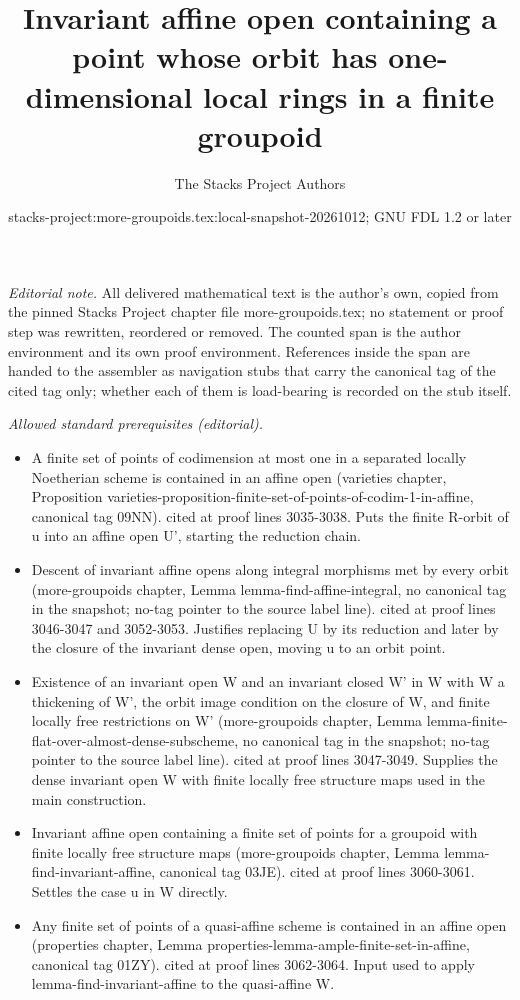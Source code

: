 \documentclass{stacks-project}
\title{Invariant affine open containing a point whose orbit has one-dimensional local rings in a finite groupoid}
\author{The Stacks Project Authors}
\date{stacks-project:more-groupoids.tex:local-snapshot-20261012; GNU FDL 1.2 or later}
\theoremstyle{plain}
\theoremstyle{definition}
\theoremstyle{remark}
\numberwithin{equation}{subsection}
\begin{document}
\maketitle
\setcounter{subsection}{1}
\noindent\textit{Editorial note.} All delivered mathematical text is the author's own, copied from the pinned Stacks Project chapter file more-groupoids.tex; no statement or proof step was rewritten, reordered or removed. The counted span is the author environment and its own proof environment. References inside the span are handed to the assembler as navigation stubs that carry the canonical tag of the cited tag only; whether each of them is load-bearing is recorded on the stub itself.\par\medskip
\noindent\textit{Allowed standard prerequisites (editorial).}\begin{itemize}
\item A finite set of points of codimension at most one in a separated locally Noetherian scheme is contained in an affine open (varieties chapter, Proposition varieties-proposition-finite-set-of-points-of-codim-1-in-affine, canonical tag 09NN). cited at proof lines 3035-3038. Puts the finite R-orbit of u into an affine open U', starting the reduction chain.
\item Descent of invariant affine opens along integral morphisms met by every orbit (more-groupoids chapter, Lemma lemma-find-affine-integral, no canonical tag in the snapshot; no-tag pointer to the source label line). cited at proof lines 3046-3047 and 3052-3053. Justifies replacing U by its reduction and later by the closure of the invariant dense open, moving u to an orbit point.
\item Existence of an invariant open W and an invariant closed W' in W with W a thickening of W', the orbit image condition on the closure of W, and finite locally free restrictions on W' (more-groupoids chapter, Lemma lemma-finite-flat-over-almost-dense-subscheme, no canonical tag in the snapshot; no-tag pointer to the source label line). cited at proof lines 3047-3049. Supplies the dense invariant open W with finite locally free structure maps used in the main construction.
\item Invariant affine open containing a finite set of points for a groupoid with finite locally free structure maps (more-groupoids chapter, Lemma lemma-find-invariant-affine, canonical tag 03JE). cited at proof lines 3060-3061. Settles the case u in W directly.
\item Any finite set of points of a quasi-affine scheme is contained in an affine open (properties chapter, Lemma properties-lemma-ample-finite-set-in-affine, canonical tag 01ZY). cited at proof lines 3062-3064. Input used to apply lemma-find-invariant-affine to the quasi-affine W.

\end{itemize}
\end{document}
